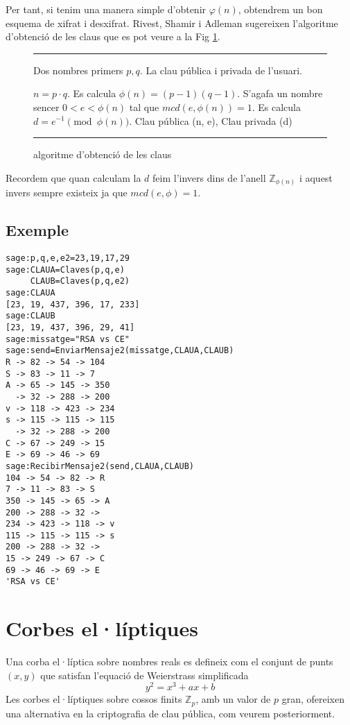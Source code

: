 \documentclass[journal]{IEEEtran}
\begin{document}
Per tant, si tenim una manera simple d'obtenir $\varphi (n)$, obtendrem un bon esquema de xifrat i desxifrat. Rivest, Shamir i Adleman sugereixen  l'algoritme d'obtenció de les claus que es pot veure a la Fig \ref{alg:RSA}.

\begin{figure}[h!]
\hrule
\hspace*{2pt}
\begin{algorithmic}[1]
	\REQUIRE Dos nombres primers $p, q$.
	\ENSURE La clau pública i privada de l'usuari.
	
	\medskip
	\STATE $n = p \cdot q$.
	\STATE Es calcula $\phi(n) = (p-1)(q-1)$.
	\STATE S'agafa un nombre sencer $0 < e < \phi(n)$ tal que $mcd(e, \phi(n)) = 1$.
	\STATE Es calcula $d = e^{-1} \pmod{ \phi(n) }$.
	\RETURN Clau pública (n, e), Clau privada (d)
\end{algorithmic}
\hrule
\caption{algoritme d'obtenció de les claus}\label{alg:RSA}

\end{figure}

Recordem que quan calculam la $d$ feim l'invers dins de l'anell $\mathbb{Z}_{\phi(n)}$ i aquest invers sempre existeix ja que $mcd ( e, \phi) = 1$.

\subsection{Exemple}
\begin{scriptsize}
\begin{verbatim}
sage:p,q,e,e2=23,19,17,29
sage:CLAUA=Claves(p,q,e)
     CLAUB=Claves(p,q,e2)
sage:CLAUA
[23, 19, 437, 396, 17, 233]
sage:CLAUB
[23, 19, 437, 396, 29, 41]
sage:missatge="RSA vs CE"
sage:send=EnviarMensaje2(missatge,CLAUA,CLAUB)
R -> 82 -> 54 -> 104
S -> 83 -> 11 -> 7
A -> 65 -> 145 -> 350
  -> 32 -> 288 -> 200
v -> 118 -> 423 -> 234
s -> 115 -> 115 -> 115
  -> 32 -> 288 -> 200
C -> 67 -> 249 -> 15
E -> 69 -> 46 -> 69
sage:RecibirMensaje2(send,CLAUA,CLAUB)
104 -> 54 -> 82 -> R
7 -> 11 -> 83 -> S
350 -> 145 -> 65 -> A
200 -> 288 -> 32 ->  
234 -> 423 -> 118 -> v
115 -> 115 -> 115 -> s
200 -> 288 -> 32 ->  
15 -> 249 -> 67 -> C
69 -> 46 -> 69 -> E
'RSA vs CE'
\end{verbatim}
\end{scriptsize}
\section{Corbes el·líptiques}
Una corba el·líptica sobre nombres reals es defineix com el conjunt de punts $(x,y)$ que satisfan l'equació de Weierstrass simplificada
\[
y^2 = x^3+ ax + b
\]
Les corbes el·líptiques sobre cossos finits $\mathbb{Z}_p$, amb un valor de $p$ gran, ofereixen una alternativa en la criptografia de clau pública, com veurem posteriorment.
\end{document}
